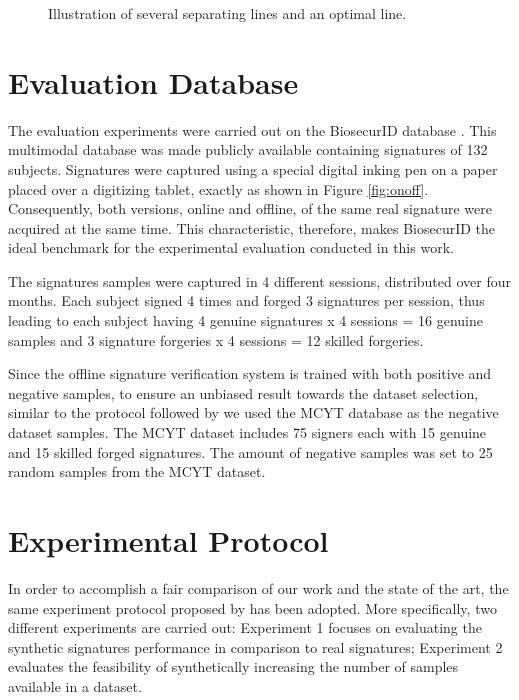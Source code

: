 \begin{figure*}[!htb]
\centering
\hspace*{0.5in} %

\caption{Illustration of several separating lines and an optimal line.} \label{fig:svm}
\end{figure*}


\section{Evaluation Database}

The evaluation experiments were carried out on the BiosecurID database \cite{biosecurid}. This multimodal database was made publicly available containing signatures of 132 subjects. Signatures were captured using a special digital inking pen on a paper placed over a digitizing tablet, exactly as shown in Figure \ref{fig:onoff}. Consequently, both versions, online and offline, of the same real signature were acquired at the same time. This characteristic, therefore, makes BiosecurID the ideal benchmark for the experimental evaluation conducted in this work.


The signatures samples were captured in 4 different sessions, distributed over four months. Each subject signed 4 times and forged 3 signatures per session, thus leading to each subject having 4 genuine signatures x 4 sessions = 16 genuine samples and 3 signature forgeries x 4 sessions = 12 skilled forgeries.

Since the offline signature verification system is trained with both positive and negative samples, to ensure an unbiased result towards the dataset selection, similar to the protocol followed by \cite{diaz2014generation} we used the MCYT database \cite{mcyt-100} as the negative dataset samples. The MCYT dataset includes 75 signers each with 15 genuine and 15 skilled forged signatures. The amount of negative samples was set to 25 random samples from the MCYT dataset.



\section{Experimental Protocol}
In order to accomplish a fair comparison of our work and the state of the art, the same experiment protocol proposed by \cite{diaz2014generation} has been adopted. More specifically, two different experiments are carried out: Experiment 1 focuses on evaluating the synthetic signatures performance in comparison to real signatures; Experiment 2 evaluates the feasibility of synthetically increasing the number of samples available in a dataset.

